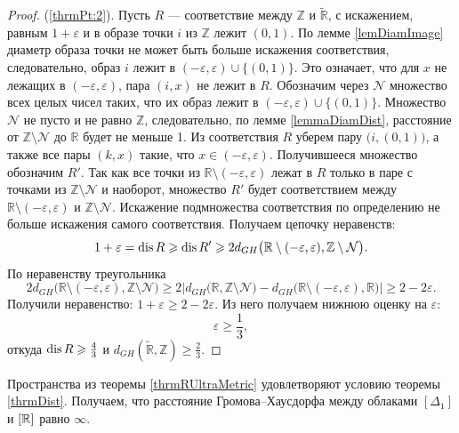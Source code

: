 \begin{proof}
  (\ref{thrmPt:2}).
  Пусть $R$ --- соответствие
  между $\mathbb{Z}$ и $\widetilde{\mathbb{R}}$, с искажением,
  равным $1 + \varepsilon$ и
  в образе точки $i$ из $\mathbb{Z}$ лежит $(0,1)$. По лемме
  \ref{lemDiamImage} диаметр
  образа точки не может быть больше искажения соответствия,
  следовательно, образ $i$ лежит в $(-\varepsilon, \varepsilon) \cup
  \bigl\{(0,1)\bigr\}$. Это
  означает, что для
  $x$ не лежащих в $(-\varepsilon, \varepsilon)$, пара $(i, x)$ не лежит в $R$.
  Обозначим через $\mathcal{N}$ множество всех целых чисел таких, что их
  образ лежит в $(-\varepsilon, \varepsilon) \cup
  \bigl\{(0,1)\bigr\}$. Множество
  $\mathcal{N}$ не пусто и не равно $\mathbb{Z}$, следовательно, по
  лемме \ref{lemmaDiamDist},
  расстояние от $\mathbb{Z} \setminus\mathcal{N}$ до $\mathbb{R}$ будет не
  меньше 1.
  Из соответствия $R$ уберем пару $\bigl(i,(0,1)\bigr)$, а также
  все пары $(k,x)$ такие, что $x \in  (-\varepsilon, \varepsilon)$.
  Получившееся множество обозначим $R'$.
  Так как все точки из $\mathbb{R}\setminus(-\varepsilon,
  \varepsilon)$ лежат в $R$
  только в паре с точками из $ \mathbb{Z} \setminus\mathcal{N}$ и наоборот,
  множество $R'$ будет соответствием между
  $\mathbb{R}\setminus(-\varepsilon, \varepsilon)$ и
  $ \mathbb{Z} \setminus\mathcal{N}$. Искажение
  подмножества соответствия по определению не больше искажения
  самого соответствия. Получаем цепочку неравенств:
  \[1+\varepsilon = \operatorname{dis} R \geqslant \operatorname{dis} R' \geqslant
    2d_{GH}\bigl(\mathbb{R}\setminus(-\varepsilon, \varepsilon), \mathbb{Z}
  \setminus \mathcal{N}\bigr).\]
  По неравенству треугольника
  \[
    2d_{GH}\bigl(\mathbb{R}\setminus(-\varepsilon, \varepsilon), \mathbb{Z}
    \setminus \mathcal{N}\bigr) \ge
    2\Big|d_{GH}\bigl(\mathbb{R}, \mathbb{Z} \setminus
    \mathcal{N}\bigr) - d_{GH}\bigl(\mathbb{R}\setminus(-\varepsilon,
    \varepsilon), \mathbb{R}\bigr)\Big| \ge 2 - 2\varepsilon.
  \]
  Получили неравенство: $1 + \varepsilon \ge 2 - 2\varepsilon$.
  Из него получаем нижнюю оценку на $\varepsilon$:
  \[\varepsilon \ge \frac 1 3,\]
  откуда $\operatorname{dis} R \geqslant \frac 4 3$ и
  $d_{GH}\left(\widetilde{\mathbb{R}}, \mathbb{Z}\right) \ge \frac 2
  3 $.
\end{proof}
\begin{corollary}
  Пространства из теоремы \ref{thrmRUltraMetric} удовлетворяют
  условию теоремы \ref{thrmDist}. Получаем, что расстояние
  Громова--Хаусдорфа между облаками \( [\Delta _1] \) и \( [\mathbb R] \)
  равно \( \infty \).
\end{corollary}

